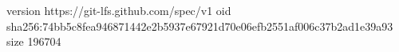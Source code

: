 version https://git-lfs.github.com/spec/v1
oid sha256:74bb5c8fea946871442e2b5937e67921d70e06efb2551af006c37b2ad1e39a93
size 196704
